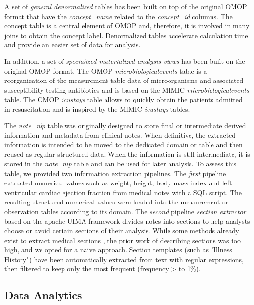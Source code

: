 A set of \emph{general denormalized} tables has been built on top of the original 
OMOP  format that have the \textit{concept\_name} related to the \textit{concept\_id} 
columns. The concept table is a central element of OMOP and, therefore, it is 
involved in many joins to obtain the concept label. Denormalized tables accelerate 
calculation time and provide an easier set of data for analysis.

In addition, a set of \emph{specialized materialized analysis views} has been built 
on the original OMOP format. The OMOP \textit{microbiologicalevents} table is a reorganization of the 
measurement table data of microorganisms and associated susceptibility testing 
antibiotics and is based on the MIMIC \textit{microbiologicalevents} table. 
The OMOP \textit{icustays} table allows to quickly obtain the patients admitted in 
resuscitation and is inspired by the MIMIC \textit{icustays} tables.

The \textit{note\_nlp} table was originally designed to store final or intermediate 
derived information and metadata from clinical notes. When definitive, the 
extracted information is intended to be moved to the dedicated domain or table 
and then reused as regular structured data. 
When the information is still intermediate, it is stored in the \textit{note\_nlp} 
table and can be used for later analysis. 
To assess this table, we provided two information extraction pipelines. 
The \emph{first} pipeline extracted numerical values such as weight, height, 
body mass index and left ventricular cardiac ejection fraction from medical notes 
with a SQL script. The resulting structured numerical values were loaded into the 
measurement or observation tables according to its domain. 
The \emph{second} pipeline \emph{section extractor} based on the apache UIMA 
framework divides notes into sections to help analysts choose or avoid certain 
sections of their analysis. While some methods already exist to extract 
medical sections \cite{section-extraction}, the prior work of describing sections 
was too high, and we opted for a naive approach. Section templates (such as 
"Illness History") have been automatically extracted from text with regular 
expressions, then filtered to keep only the most frequent (frequency > to 1\%). 

%
%
\subsection{Data Analytics}

